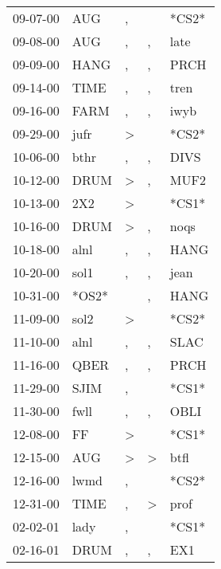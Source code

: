 \begin{supertabular}{lllll}
 09-07-00 &    AUG &                , &                  &  *CS2* \\
 09-08-00 &    AUG &                , &                , &   late \\
 09-09-00 &   HANG &                , &                , &   PRCH \\
 09-14-00 &   TIME &                , &                , &   tren \\
 09-16-00 &   FARM &                , &                , &   iwyb \\
 09-29-00 &   jufr &     \textgreater &                  &  *CS2* \\
 10-06-00 &   bthr &                , &                , &   DIVS \\
 10-12-00 &   DRUM &     \textgreater &                , &   MUF2 \\
 10-13-00 &    2X2 &     \textgreater &                  &  *CS1* \\
 10-16-00 &   DRUM &     \textgreater &                , &   noqs \\
 10-18-00 &   alnl &                , &                , &   HANG \\
 10-20-00 &   sol1 &                , &                , &   jean \\
 10-31-00 &  *OS2* &                  &                , &   HANG \\
 11-09-00 &   sol2 &     \textgreater &                  &  *CS2* \\
 11-10-00 &   alnl &                , &                , &   SLAC \\
 11-16-00 &   QBER &                , &                , &   PRCH \\
 11-29-00 &   SJIM &                , &                  &  *CS1* \\
 11-30-00 &   fwll &                , &                , &   OBLI \\
 12-08-00 &     FF &     \textgreater &                  &  *CS1* \\
 12-15-00 &    AUG &     \textgreater &     \textgreater &   btfl \\
 12-16-00 &   lwmd &                , &                  &  *CS2* \\
 12-31-00 &   TIME &                , &     \textgreater &   prof \\
 02-02-01 &   lady &                , &                  &  *CS1* \\
 02-16-01 &   DRUM &                , &                , &    EX1 \\

\end{supertabular}
